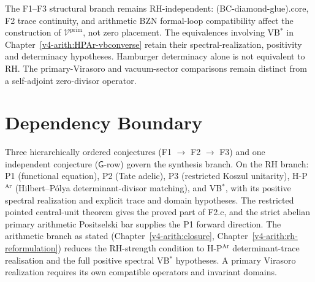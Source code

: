 The F1--F3 structural branch remains RH-independent: (BC-diamond-glue).core,
F2 trace continuity, and arithmetic BZN formal-loop compatibility affect the
construction of \(\mathcal{V}^{\mathrm{prim}}\), not zero
placement. The equivalences involving VB\(^{*}\) in
Chapter~\ref{v4-arith:HPAr-vbconverse} retain their spectral-realization,
positivity and determinacy hypotheses. Hamburger determinacy alone
is not equivalent to RH. The primary-Virasoro and vacuum-sector
comparisons remain distinct from a self-adjoint zero-divisor operator.

\section{Dependency Boundary}
\label{v4-arith:app:C:summary}

Three hierarchically ordered conjectures (F1 \(\to\) F2 \(\to\) F3)
and one independent conjecture (\(\mathsf{G}\)-row) govern the
synthesis branch. On the RH branch: P1 (functional equation),
P2 (Tate adelic), P3 (restricted Koszul unitarity),
H-P\(^{\mathrm{Ar}}\) (Hilbert--P\'olya determinant-divisor matching), and
VB\(^{*}\), with its positive spectral realization and explicit
trace and domain hypotheses. The restricted pointed central-unit theorem gives the
proved part of F2.c, and the strict abelian primary arithmetic
Positselski bar supplies the P1 forward direction. The arithmetic branch as stated
(Chapter~\ref{v4-arith:closure}, Chapter~\ref{v4-arith:rh-reformulation}) reduces
the RH-strength condition to H-P\(^{\mathrm{Ar}}\) determinant-trace
realisation and the full positive spectral VB\(^{*}\) hypotheses.
A primary Virasoro realization requires its own compatible operators
and invariant domains.
